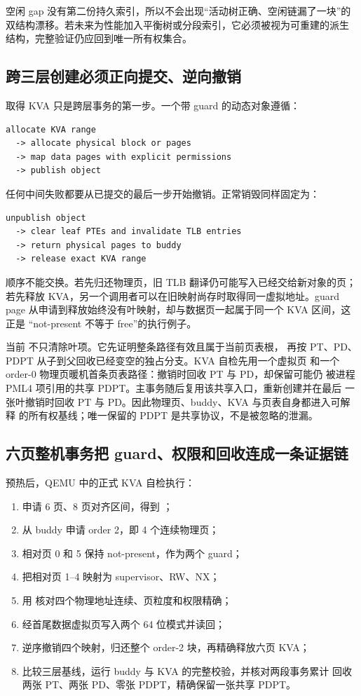 空闲 gap 没有第二份持久索引，所以不会出现“活动树正确、空闲链漏了一块”的
双结构漂移。若未来为性能加入平衡树或分段索引，它必须被视为可重建的派生
结构，完整验证仍应回到唯一所有权集合。

\subsection{跨三层创建必须正向提交、逆向撤销}

取得 KVA 只是跨层事务的第一步。一个带 guard 的动态对象遵循：

\begin{verbatim}
allocate KVA range
  -> allocate physical block or pages
  -> map data pages with explicit permissions
  -> publish object
\end{verbatim}

任何中间失败都要从已提交的最后一步开始撤销。正常销毁同样固定为：

\begin{verbatim}
unpublish object
  -> clear leaf PTEs and invalidate TLB entries
  -> return physical pages to buddy
  -> release exact KVA range
\end{verbatim}

顺序不能交换。若先归还物理页，旧 TLB 翻译仍可能写入已经交给新对象的页；
若先释放 KVA，另一个调用者可以在旧映射尚存时取得同一虚拟地址。guard page
从申请到释放始终没有叶映射，却与数据页一起属于同一个 KVA 区间，这正是
“not-present 不等于 free”的执行例子。

当前  不只清除叶项。它先证明整条路径有效且属于当前页表根，
再按 PT、PD、PDPT 从子到父回收已经变空的独占分支。KVA 自检先用一个虚拟页
和一个 order-0 物理页暖机首条页表路径：撤销时回收 PT 与 PD，却保留可能仍
被进程 PML4 项引用的共享 PDPT。主事务随后复用该共享入口，重新创建并在最后
一张叶撤销时回收 PT 与 PD。因此物理页、buddy、KVA 与页表自身都进入可解释
的所有权基线；唯一保留的 PDPT 是共享协议，不是被忽略的泄漏。

\subsection{六页整机事务把 guard、权限和回收连成一条证据链}

预热后，QEMU 中的正式 KVA 自检执行：

\begin{enumerate}[label=\arabic*.]
  \item 申请 6 页、8 页对齐区间，得到
        ；
  \item 从 buddy 申请 order 2，即 4 个连续物理页；
  \item 相对页 0 和 5 保持 not-present，作为两个 guard；
  \item 把相对页 1--4 映射为 supervisor、RW、NX；
  \item 用  核对四个物理地址连续、页粒度和权限精确；
  \item 经首尾数据虚拟页写入两个 64 位模式并读回；
  \item 逆序撤销四个映射，归还整个 order-2 块，再精确释放六页 KVA；
  \item 比较三层基线，运行 buddy 与 KVA 的完整校验，并核对两段事务累计
        回收两张 PT、两张 PD、零张 PDPT，精确保留一张共享 PDPT。
\end{enumerate}

